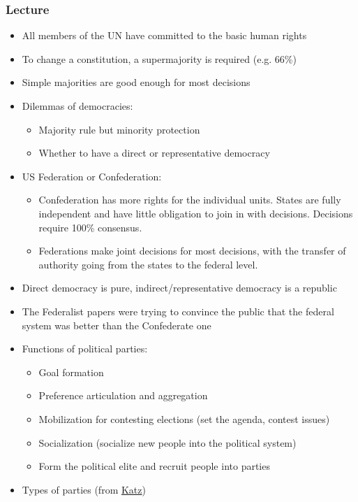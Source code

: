 \documentclass[11pt]{article}
\begin{document}
\subsubsection{Lecture}
\label{sec:org9913d9b}
\begin{itemize}
\item All members of the UN have committed to the basic human rights
\item To change a constitution, a supermajority is required (e.g. 66\%)
\item Simple majorities are good enough for most decisions
\item Dilemmas of democracies:
\begin{itemize}
\item Majority rule but minority protection
\item Whether to have a direct or representative democracy
\end{itemize}
\item US Federation or Confederation:
\begin{itemize}
\item Confederation has more rights for the individual units. States are fully
independent and have little obligation to join in with decisions. Decisions
require 100\% consensus.
\item Federations make joint decisions for most decisions, with the transfer of
authority going from the states to the federal level.
\end{itemize}
\item Direct democracy is pure, indirect/representative democracy is a republic
\item The Federalist papers were trying to convince the public that the federal
system was better than the Confederate one
\item Functions of political parties:
\begin{itemize}
\item Goal formation
\item Preference articulation and aggregation
\item Mobilization for contesting elections (set the agenda, contest issues)
\item Socialization (socialize new people into the political system)
\item Form the political elite and recruit people into parties
\end{itemize}
\item Types of parties (from \href{20200716205451-katz.org}{Katz})
\begin{itemize}

\end{itemize}
\end{itemize}
\end{document}
